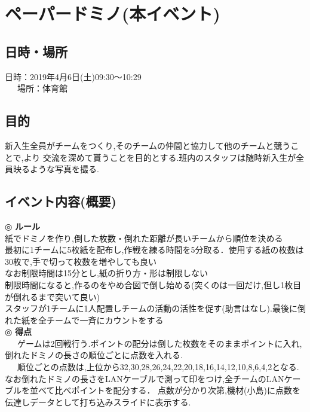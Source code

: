 \documentclass[a4j]{jarticle}
\begin{document}
\section{ペーパードミノ(本イベント)}
\subsection{日時・場所}
日時：2019年4月6日(土)09:30〜10:29\\
\ \ \ 場所：体育館\\
\subsection{目的}
新入生全員がチームをつくり,そのチームの仲間と協力して他のチームと競うことで,より
交流を深めて貰うことを目的とする.班内のスタッフは随時新入生が全員映るような写真を撮る.
\subsection{イベント内容(概要)}
\hspace{-5mm}
◎ \textbf{ルール} \\
紙でドミノを作り,倒した枚数・倒れた距離が長いチームから順位を決める \\
最初に1チームに5枚紙を配布し,作戦を練る時間を5分取る．使用する紙の枚数は30枚で,手で切って枚数を増やしても良い \\
なお制限時間は15分とし,紙の折り方・形は制限しない \\
制限時間になると,作るのをやめ合図で倒し始める(突くのは一回だけ,但し1枚目が倒れるまで突いて良い) \\
スタッフが1チームに1人配置しチームの活動の活性を促す(助言はなし).最後に倒れた紙を全チームで一斉にカウントをする \\
◎ \textbf{得点} \\
\ \ \ ゲームは2回戦行う.ポイントの配分は倒した枚数をそのままポイントに入れ,倒れたドミノの長さの順位ごとに点数を入れる.\\
\ \ \ 順位ごとの点数は,上位から32,30,28,26,24,22,20,18,16,14,12,10,8,6,4,2となる.
なお倒れたドミノの長さをLANケーブルで測って印をつけ,全チームのLANケーブルを並べて比べポイントを配分する．
点数が分かり次第,機材(小島)に点数を伝達しデータとして打ち込みスライドに表示する.
\end{document}
